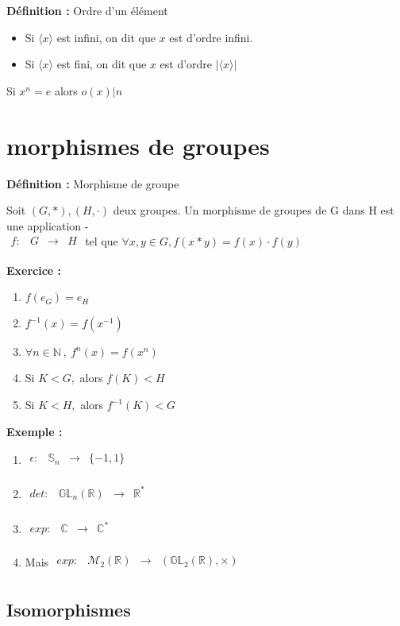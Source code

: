\documentclass{report}
\newenvironment{definition}[1][]{
    \begin{tcolorbox}[colframe= white]
    \textbf{Définition :} 
    #1 \par
    }
    {\end{tcolorbox}}
\newenvironment{exemple}{\begin{tcolorbox}[colback=gray!10,colframe= white]
    \textbf{Exemple :}
     \par}
    {\end{tcolorbox}}
\newenvironment{exo}{\begin{tcolorbox}[colframe= white]
    \textbf{Exercice :}
    \par}
    {\end{tcolorbox}}
\newcommand{\mat}[2]{
    \mathcal{M}_{#1}(\mathbb{#2})
}
\newcommand{\gl}[2]{
    \mathcal{\mathbb{G}\mathbb{L}}_{#1}(\mathbb{#2})
}
\newcommand{\fctsarg}[3]{
    \begin{array}{lrcl}
    #1: & #2 & \longrightarrow & #3 \\
    \end{array}
}
\newcommand{\N}{\mathbb{N}}
\newcommand{\R}{\mathbb{R}}
\newcommand{\C}{\mathbb{C}}
\newcommand{\sn}{\mathbb{S}_n}
\begin{document}
\begin{definition}[Ordre d'un élément]
\begin{itemize}[label=$\bullet$]
\item Si $\langle x \rangle$ est infini, on dit que $x$ est d'ordre infini.
\item Si $\langle x \rangle$ est fini, on dit que $x$ est d'ordre $\lvert\langle x \rangle\rvert$
\end{itemize}
Si $x^{n}=e$ alors $o(x)|n$
\end{definition}

\section{morphismes de groupes}
\begin{definition}[Morphisme de groupe]
Soit $(G,\ast), (H,\cdot)$ deux groupes. Un morphisme de groupes de G dans H est une application
{\color{white}-}\\
$\fctsarg{f}{G}{H}$ tel que $\forall x,y \in G, f(x \ast y) = f(x) \cdot f(y)$
\end{definition}

\begin{exo}
\begin{enumerate}
\item $f(e_{G})=e_{H}$
\item $f^{-1}(x)=f(x^{-1})$
\item $\forall n \in \N~,~ f^{n}(x)=f(x^{n})$
\item Si $K < G,$ alors $f(K) < H$
\item Si $K < H,$ alors $f^{-1}(K) < G$
\end{enumerate}
\end{exo}

\begin{exemple}
\begin{enumerate}
    \item $\fctsarg{\epsilon}{\sn}{\{-1,1\}}$ 
    \item $\fctsarg{det}{\gl{n}{\R}}{\R^*}$
    \item $\fctsarg{exp}{\C}{\C^*}$
    \item Mais $\fctsarg{exp}{\mat{2}{R}}{(\gl{2}{\R},\times)}$
\end{enumerate}
\end{exemple}

\subsection{Isomorphismes}
\end{document}

